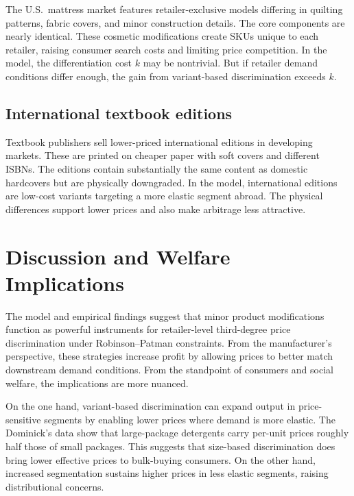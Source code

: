 \documentclass[12pt]{article}
\theoremstyle{definition}
\begin{document}
The U.S.\ mattress market features retailer-exclusive models differing in quilting patterns, fabric covers, and minor construction details. The core components are nearly identical.
These cosmetic modifications create SKUs unique to each retailer, raising consumer search costs and limiting price competition.
In the model, the differentiation cost $k$ may be nontrivial. But if retailer demand conditions differ enough, the gain from variant-based discrimination exceeds $k$.

\subsection{International textbook editions}

Textbook publishers sell lower-priced international editions in developing markets. These are printed on cheaper paper with soft covers and different ISBNs.
The editions contain substantially the same content as domestic hardcovers but are physically downgraded.
In the model, international editions are low-cost variants targeting a more elastic segment abroad. The physical differences support lower prices and also make arbitrage less attractive.


\section{Discussion and Welfare Implications}\label{sec:welfare}

The model and empirical findings suggest that minor product modifications function as powerful instruments for retailer-level third-degree price discrimination under Robinson--Patman constraints.
From the manufacturer's perspective, these strategies increase profit by allowing prices to better match downstream demand conditions.
From the standpoint of consumers and social welfare, the implications are more nuanced.

On the one hand, variant-based discrimination can expand output in price-sensitive segments by enabling lower prices where demand is more elastic.
The Dominick's data show that large-package detergents carry per-unit prices roughly half those of small packages. This suggests that size-based discrimination does bring lower effective prices to bulk-buying consumers.
On the other hand, increased segmentation sustains higher prices in less elastic segments, raising distributional concerns.
\end{document}

